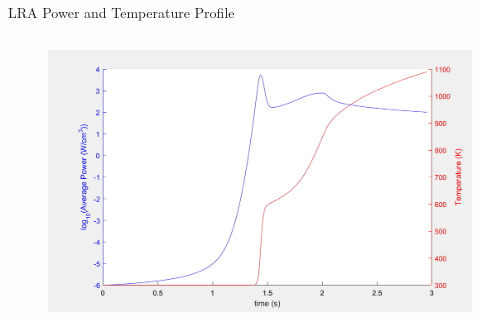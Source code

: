 \documentclass[8pt,xcolor=dvipnames]{beamer}
\begin{document}
\begin{frame}{LRA Power and Temperature Profile}

\begin{figure}
\includegraphics[width=\linewidth,height=3in,keepaspectratio]{figures/lra_profile.png}
\end{figure}

\end{frame}
\end{document}
